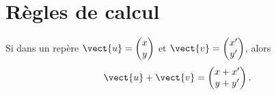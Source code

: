 \section{Règles de calcul}

\begin{propriete}
    Si dans un repère \( \vect{ u }=\begin{pmatrix}
        x    \\ 
        y    
    \end{pmatrix}\) et \( \vect{ v }=\begin{pmatrix}
        x'    \\ 
        y'    
    \end{pmatrix}\), alors 
    \begin{equation}
        \vect{ u }+\vect{ v }=\begin{pmatrix}
            x+x'    \\ 
            y+y'    
        \end{pmatrix}.
    \end{equation}
    
\end{propriete}

